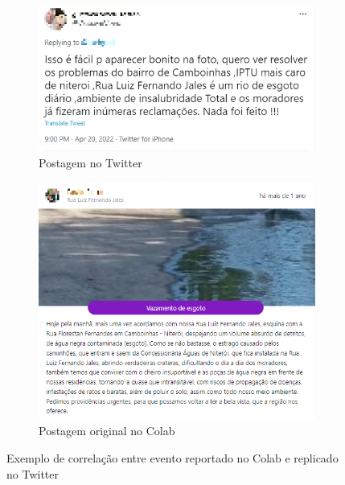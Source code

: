 \begin{figure}[!htb]
	\centering
	\begin{subfigure}{0.4\textwidth}
		\centering
		\includegraphics[width=\linewidth]{images/colab_hiper_reality_corr_01.png}
		\caption{Postagem no Twitter}
		\label{fig:colab_hiper_reality_corr_01}
	\end{subfigure}
	\hspace{5mm}
	\begin{subfigure}{0.6\textwidth}
		\centering
		\includegraphics[width=\linewidth]{images/colab_hiper_reality_corr_02.PNG}
		\caption{Postagem original no Colab}
		\label{fig:colab_hiper_reality_corr_02}
	\end{subfigure}
	\caption{Exemplo de correlação entre evento reportado no Colab e replicado no Twitter}
	\label{fig:colab_hiper_reality}
\end{figure}



